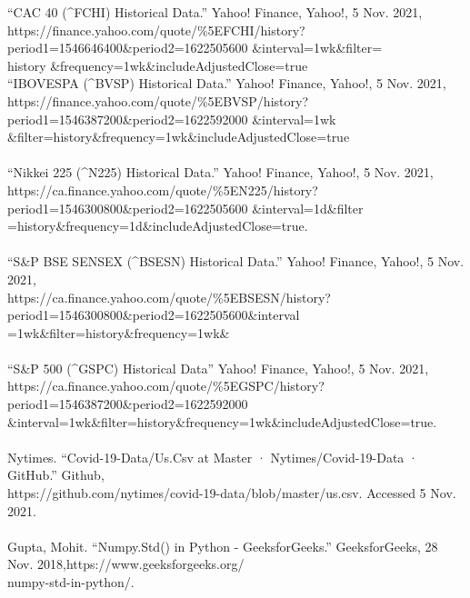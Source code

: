 \documentclass[fontsize=11pt]{article}
\begin{document}
“CAC 40 (\textasciicircum FCHI) Historical Data.” Yahoo! Finance, Yahoo!, 5 Nov. 2021,\\ {https://finance.yahoo.com/quote/\%5EFCHI/history?period1=1546646400\&period2=1622505600
\&interval=1wk\&filter=\\history 
\&frequency=1wk\&includeAdjustedClose=true}
\newline 
\\
“IBOVESPA (\textasciicircum BVSP) Historical Data.”  Yahoo! Finance, Yahoo!, 5 Nov. 2021,\\
https://finance.yahoo.com/quote/\%5EBVSP/history?period1=1546387200\&period2=1622592000
\&interval=1wk\\\&filter=history\&frequency=1wk\&includeAdjustedClose=true\\ 
\\
“Nikkei 225 (\textasciicircum N225) Historical Data.” Yahoo! Finance, Yahoo!, 5 Nov. 2021, \\
https://ca.finance.yahoo.com/quote/\%5EN225/history?period1=1546300800\&period2=1622505600
\&interval=1d\&filter\\
=history\&frequency=1d\&includeAdjustedClose=true.\\ 
\\
“S\&P BSE SENSEX (\textasciicircum BSESN) Historical Data.” Yahoo! Finance, Yahoo!, 5 Nov. 2021,\\
https://ca.finance.yahoo.com/quote/\%5EBSESN/history?period1=1546300800\&period2=1622505600\&interval\\=1wk\&filter=history\&frequency=1wk\&
\\
\\
“S\&P 500 (\textasciicircum GSPC) Historical Data” Yahoo! Finance, Yahoo!, 5 Nov. 2021,\\
https://ca.finance.yahoo.com/quote/\%5EGSPC/history?\\period1=1546387200\&period2=1622592000
\&interval=1wk\&filter=history\&frequency=1wk\&includeAdjustedClose=true.
\\
\\
Nytimes. “Covid-19-Data/Us.Csv at Master · Nytimes/Covid-19-Data · GitHub.” Github,\\ https://github.com/nytimes/covid-19-data/blob/master/us.csv. Accessed 5 Nov. 2021.
\\ 
\\
Gupta, Mohit. “Numpy.Std() in Python - GeeksforGeeks.” GeeksforGeeks, 28 Nov. 2018,https://www.geeksforgeeks.org/\\
numpy-std-in-python/.
\\
\end{document}
